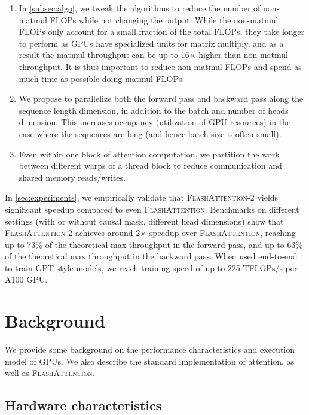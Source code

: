 \begin{enumerate}
  \item In \ref{subsec:algo}, we tweak the algorithms to reduce the number of non-matmul FLOPs while not changing the output. While the non-matmul FLOPs only account for a small fraction of the total FLOPs, they take longer to perform as GPUs have specialized units for matrix multiply, and as a result the matmul throughput can be up to 16$\times$ higher than non-matmul throughput. It is thus important to reduce non-matmul FLOPs and spend as much time as possible doing matmul FLOPs.

  \item We propose to parallelize both the forward pass and backward pass along the sequence length dimension, in addition to the batch and number of heads dimension. This increases occupancy (utilization of GPU resources) in the case where the sequences are long (and hence batch size is often small).

  \item Even within one block of attention computation, we partition the work between different warps of a thread block to reduce communication and shared memory reads/writes.

\end{enumerate}

In \ref{sec:experiments}, we empirically validate that \textsc{FlashAttention-2} yields significant speedup compared to even \textsc{FlashAttention}. Benchmarks on different settings (with or without causal mask, different head dimensions) show that \textsc{FlashAttention-2} achieves around 2$\times$ speedup over
\textsc{FlashAttention}, reaching up to 73\% of the theoretical max throughput in the forward pass, and up to 63\% of the theoretical max throughput in the backward pass. When used end-to-end to train GPT-style models, we reach training speed of up to 225 TFLOPs/s per A100 GPU.

\section{Background}
\label{sec:background}

We provide some background on the performance characteristics and execution model of GPUs. We also describe the standard implementation of attention, as well as
\textsc{FlashAttention}.

\subsection{Hardware characteristics}
\label{subsec:hardware}

